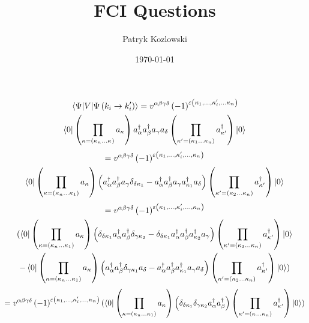 \documentclass[12pt]{article}
\title{FCI Questions}
\author{Patryk Kozlowski}
\date{\today} %
\begin{document}
\maketitle
\begin{multline}
    \mel{\Psi}{V}{\Psi\left(k_{i}\rightarrow k_{i}^{\prime}\right)}
    =v^{\alpha\beta\gamma\delta} \left(-1\right)^{\varepsilon\left(\kappa_{1},\dots,\kappa_{i}^{\prime},\dots\kappa_{n}\right)}\\
    \bra{0}\left(\prod_{\kappa=\left(\kappa_{n}\dots\kappa_{}\right)}a_{\kappa}\right) 
    a^{\dag}_{\alpha}a^{\dag}_{\beta}a_{\gamma}a_{\delta}
    \left(\prod_{\kappa^{\prime}=\left(\kappa_{1}\dots\kappa_{n}\right)}a^{\dag}_{\kappa^{\prime}}\right)\ket{0}    
\end{multline}
\begin{multline}
    =v^{\alpha\beta\gamma\delta}\left(-1\right)^{\varepsilon\left(\kappa_{1},\dots,\kappa_{i}^{\prime},\dots,\kappa_{n}\right)}\\
       \bra{0}\left(\prod_{\kappa=\left(\kappa_{n}\dots\kappa_{1}\right)}a_{\kappa}\right)
        \left(a^{\dag}_{\alpha}a^{\dag}_{\beta}a_{\gamma}\delta_{\delta\kappa_{1}}-a^{\dag}_{\alpha}a^{\dag}_{\beta}a_{\gamma}a^{\dag}_{\kappa_{1}}a_{\delta}\right)
       \left(\prod_{\kappa^{\prime}=\left(\kappa_{2}\dots\kappa_{n}\right)}a^{\dag}_{\kappa^{\prime}}\right)\ket{0}
\end{multline}
\begin{multline}
    =v^{\alpha\beta\gamma\delta}
    \left(-1\right)^{\varepsilon\left(\kappa_{1},\dots,\kappa_{i}^{\prime},\dots,\kappa_{n}\right)}\\
    (
    \bra{0}\left(\prod_{\kappa=\left(\kappa_{n}\dots\kappa_{1}\right)}a_{\kappa}\right)
        \left(\delta_{\delta\kappa_{1}}a^{\dag}_{\alpha}a^{\dag}_{\beta}\delta_{\gamma\kappa_{2}}-\delta_{\delta\kappa_{1}}a^{\dag}_{\alpha}a^{\dag}_{\beta}a^{\dag}_{\kappa_{2}}a_{\gamma}\right)
    \left(\prod_{\kappa^{\prime}=\left(\kappa_{3}\dots\kappa_{n}\right)}a^{\dag}_{\kappa^{\prime}}\right)\ket{0}\\
    -\bra{0}\left(\prod_{\kappa=\left(\kappa_{n}\dots\kappa_{1}\right)}a_{\kappa}\right)
            \left(a^{\dag}_{\alpha}a^{\dag}_{\beta}\delta_{\gamma\kappa_{1}}a_{\delta}-a^{\dag}_{\alpha}a^{\dag}_{\beta}a^{\dag}_{\kappa_{1}}a_{\gamma}a_{\delta}\right)
    \left(\prod_{\kappa^{\prime}=\left(\kappa_{2}\dots\kappa_{n}\right)}a^{\dag}_{\kappa^{\prime}}\right)\ket{0}
    )
\end{multline}
\begin{multline}
    =v^{\alpha\beta\gamma\delta}\left(-1\right)^{\varepsilon\left(\kappa_{1},\dots,\kappa_{i}^{\prime},\dots,\kappa_{n}\right)}
    (
        \bra{0}\left(\prod_{\kappa=\left(\kappa_{n}\dots\kappa_{1}\right)}a_{\kappa}\right)
            \left(\delta_{\delta\kappa_{1}}\delta_{\gamma\kappa_{2}}a^{\dag}_{\alpha}a^{\dag}_{\beta}\right)
        \left(\prod_{\kappa^{\prime}=\left(\kappa_{}\dots\kappa_{n}\right)}a^{\dag}_{\kappa^{\prime}}\right)\ket{0}
    )
\end{multline}
\end{document}
